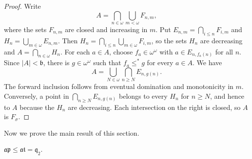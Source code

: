 \begin{proof}
Write
\[
  A=\bigcap_{n\in\omega}\bigcup_{m<\omega}F_{n,m},
\]
where the sets $F_{n,m}$ are closed and increasing in $m$.
Put $E_{n,m}=\bigcap_{i\leq n}F_{i,m}$ and
$H_n=\bigcup_{m\in\omega}E_{n,m}$.
Then $H_n=\bigcap_{i\leq n}\bigcup_{m\in\omega}F_{i,m}$, so the
sets $H_n$ are decreasing and $A=\bigcap_{n\in \omega} H_n$.
For each $a\in A$, choose $f_a\in\omega^\omega$ with
$a\in E_{n,f_a(n)}$ for all $n$.
Since $|A|<\mathfrak b$, there is $g\in\omega^\omega$ such that
$f_a\leq^*g$ for every $a\in A$. We have
\[
  A=\bigcup_{N\in\omega}\bigcap_{n\geq N}E_{n,g(n)}.
\]
The forward inclusion follows from eventual domination and monotonicity
in $m$. Conversely, a point in $\bigcap_{n\geq N}E_{n,g(n)}$ belongs
to every $H_n$ for $n\geq N$, and hence to $A$ because the $H_n$ are
decreasing. Each intersection on the right is closed, so $A$ is $F_\sigma$.
\end{proof}

Now we prove the main result of this section.

\begin{thm}\label{thm:at-equals-q2}
$\mathfrak{ap}\leq \mathfrak{at}=\mathfrak q_{2}$.
\end{thm}

